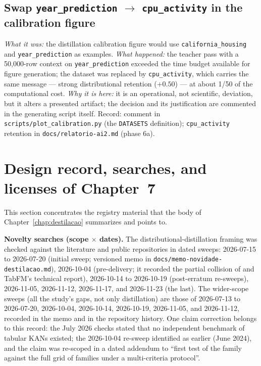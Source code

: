 \subsection[Dataset swap in the calibration figure]{Swap
\texttt{year\_\allowbreak prediction} $\to$ \texttt{cpu\_activity} in
the calibration figure}
\emph{What it was:} the distillation calibration figure would use
\texttt{california\_\allowbreak housing} and
\texttt{year\_\allowbreak prediction} as examples. \emph{What
happened:} the teacher pass with a 50{,}000-row context on
\texttt{year\_\allowbreak prediction} exceeded the time budget
available for figure generation; the dataset was replaced by
\texttt{cpu\_activity}, which carries the same message --- strong
distributional retention ($+0.50$) --- at about 1/50 of the
computational cost. \emph{Why it is here:} it is an operational, not
scientific, deviation, but it alters a presented artifact; the
decision and its justification are commented in the generating
script itself. Record: comment in
\texttt{scripts/\allowbreak plot\_\allowbreak calibration.\allowbreak py}
(the \texttt{DATASETS} definition); \texttt{cpu\_activity} retention
in \texttt{docs/\allowbreak relatorio-\allowbreak ai2.\allowbreak md}
(phase 6a).

\section{Design record, searches, and licenses of Chapter~7}
\label{sec:app-registro-cap7}

This section concentrates the registry material that the body of
Chapter~\ref{chap:destilacao} summarizes and points to.

\textbf{Novelty searches (scope $\times$ dates).} The
distributional-distillation framing was checked against the
literature and public repositories in dated sweeps: 2026-07-15 to
2026-07-20 (initial sweep; versioned memo in
\texttt{docs/\allowbreak memo-\allowbreak novidade-\allowbreak destilacao.md}),
2026-10-04 (pre-delivery; it recorded the partial collision of
\citealp{jeong2026} and TabFM's technical report), 2026-10-14 to
2026-10-19 (post-erratum re-sweeps), 2026-11-05, 2026-11-12,
2026-11-17, and 2026-11-23 (the last).
The wider-scope sweeps (all the study's gaps, not only distillation)
are those of 2026-07-13 to 2026-07-20, 2026-10-04, 2026-10-14,
2026-10-19, 2026-11-05, and 2026-11-12,
recorded in the memo and in the repository history. One claim
correction belongs to this record: the July 2026 checks stated that
no independent benchmark of tabular KANs existed; the 2026-10-04
re-sweep identified \citet{poeta2024} as earlier (June 2024), and
the claim was re-scoped in a dated addendum to ``first test of the
family against the full grid of families under a multi-criteria
protocol''.

